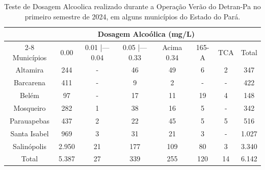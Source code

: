 \begin{table}
\begin{flushleft}
\caption{Teste de Dosagem Alcoolica realizado durante a Operação Verão do Detran-Pa no primeiro semestre de 2024, em alguns municípios do Estado do Pará.}
\end{flushleft}
\label{Bidimensional}
\vspace{0.2cm}
\begin{tabular}{c|c|c|c|c|c|c|c}
  \hline\hline
                &  \multicolumn{6}{c}{Dosagem Alcoólica (mg/L)} \\ \cline{2-8}
  Municípios     & 0.00  & 0.01 |--- 0.04 & 0.05 |--- 0.33  & Acima 0.34 & 165-A & TCA & Total  \\
  \hline
 Altamira        & 244   & -              & 46              & 49         & 6     & 2   &  347   \\
 Barcarena       & 411   & -              & 9               & 2          & -     & -   &  422 \\
 Belém           & 97    & -              & 17              & 11         & 19    & 4   &  148 \\
  Mosqueiro      & 282   & 1              & 38              & 16         & 5     & -   &  342 \\
  Parauapebas    & 437   & 2              & 22              & 45         & 5     & 5   &  516\\
  Santa Isabel   & 969   & 3              & 31              & 21         & 3     & -   &  1.027 \\
  Salinópolis    & 2.950 & 21             & 177             & 109        & 80    & 3   &  3.340 \\
  \hline\hline
  Total          & 5.387 & 27             & 339             & 255        & 120   & 14  & 6.142 \\
   \hline\hline
\end{tabular}
\end{table}